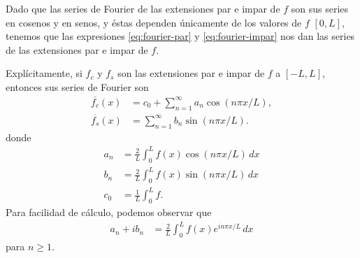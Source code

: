 \documentclass[11pt,letterpaper,draft]{report}
\newcommand\<{\langle}
\renewcommand\>{\rangle}
\begin{document}
Dado que las series de Fourier de las extensiones par e impar de $f$
son sus series en cosenos y en senos, y éstas dependen únicamente de
los valores de $f$ $[0,L]$, tenemos que las
expresiones \eqref{eq:fourier-par} y \eqref{eq:fourier-impar}
nos dan las series de las extensiones par e impar de $f$.

Explícitamente, si $f_c$ y $f_s$ son las extensiones par e impar
de $f$ a $[-L,L]$, entonces sus series de Fourier son
\begin{align*}
  \overline{f_c}(x) &= c_0 + \sum_{n=1}^{\infty}a_n\cos(n\pi x/L), \\
  \overline{f_s}(x) &= \sum_{n=1}^{\infty}b_n\sin(n\pi x/L).
\end{align*}
donde
\begin{align*}
  a_n &= \frac{2}{L}\int_{0}^L f(x)\cos(n\pi x/L)\,dx \\
  b_n &= \frac{2}{L}\int_{0}^L f(x)\sin(n\pi x/L)\,dx \\
  c_0 &= \frac{1}{L}\int_{0}^L f.
\end{align*}
Para facilidad de cálculo, podemos observar que
\begin{align*}
  a_n+ib_n
  &= \frac{2}{L}\int_0^L f(x)e^{in\pi x/L}\,dx
\end{align*}
para $n\geq 1$.
\end{document}
